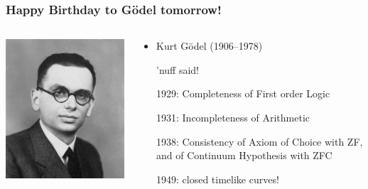 \begin{frame}
  \frametitle{Happy Birthday to G{\"o}del tomorrow!}

  \begin{columns}
    \begin{column}{.35\textwidth}
      \includegraphics[height=.6\textheight]{../assets/goedel}
    \end{column}
    \begin{column}{.7\textwidth}
      \begin{itemize}[<+->]
        \item Kurt G{\"o}del (1906--1978)
                
        \item[] 'nuff said!

        
        \item[1929:] Completeness of First order Logic
        
        \item[1931:] Incompleteness of Arithmetic    

\item[1938:] Consistency of Axiom of Choice with ZF, and of Continuum Hypothesis with ZFC  

\item[1949:] closed timelike curves!   
     
      \end{itemize}
    \end{column}
  \end{columns}
\end{frame}

